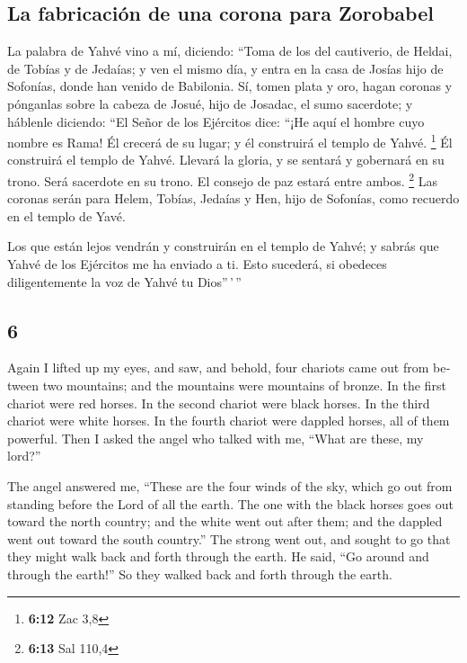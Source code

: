 \begin{paracol}{2}
\hypertarget{la-fabricaciuxf3n-de-una-corona-para-zorobabel}{%
\subsection{La fabricación de una corona para
Zorobabel}\label{la-fabricaciuxf3n-de-una-corona-para-zorobabel}}

 La palabra de Yahvé vino a mí, diciendo: 
``Toma de los del cautiverio, de Heldai, de Tobías y de Jedaías; y ven
el mismo día, y entra en la casa de Josías hijo de Sofonías, donde han
venido de Babilonia.  Sí, tomen plata y oro, hagan
coronas y pónganlas sobre la cabeza de Josué, hijo de Josadac, el sumo
sacerdote;  y háblenle diciendo: ``El Señor de los
Ejércitos dice: ``¡He aquí el hombre cuyo nombre es Rama! Él crecerá de
su lugar; y él construirá el templo de Yahvé. \footnote{\textbf{6:12}
  Zac 3,8}  Él construirá el templo de Yahvé. Llevará la
gloria, y se sentará y gobernará en su trono. Será sacerdote en su
trono. El consejo de paz estará entre ambos. \footnote{\textbf{6:13} Sal
  110,4}  Las coronas serán para Helem, Tobías, Jedaías y
Hen, hijo de Sofonías, como recuerdo en el templo de Yavé.

 Los que están lejos vendrán y construirán en el templo
de Yahvé; y sabrás que Yahvé de los Ejércitos me ha enviado a ti. Esto
sucederá, si obedeces diligentemente la voz de Yahvé tu Dios''\,'\,''

\switchcolumn
\begin{otherlanguage}{english}

\hypertarget{section-11}{%
\section{6}\label{section-11}}

 Again I lifted up my eyes, and saw, and behold, four
chariots came out from between two mountains; and the mountains were
mountains of bronze.  In the first chariot were red
horses. In the second chariot were black horses.  In the
third chariot were white horses. In the fourth chariot were dappled
horses, all of them powerful.  Then I asked the angel who
talked with me, ``What are these, my lord?''

 The angel answered me, ``These are the four winds of the
sky, which go out from standing before the Lord of all the earth.
 The one with the black horses goes out toward the north
country; and the white went out after them; and the dappled went out
toward the south country.''  The strong went out, and
sought to go that they might walk back and forth through the earth. He
said, ``Go around and through the earth!'' So they walked back and forth
through the earth.


\end{otherlanguage}
\end{paracol}
